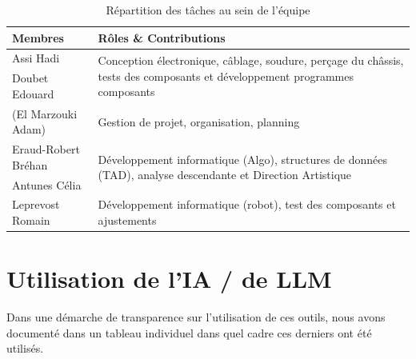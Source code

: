 \begin{table}[H]
    \centering
    \renewcommand{\arraystretch}{1.4} %
    \setlength{\tabcolsep}{12pt}      %
    
    \begin{tabular}{@{} l p{8.5cm} @{}} 
    \toprule
    \textbf{Membres} & \textbf{Rôles \& Contributions} \\ 
    \midrule
    
    Assi Hadi & \multirow{2}{=}{Conception électronique, câblage, soudure, perçage du châssis, tests des composants et développement programmes composants} \\ 
    Doubet Edouard & \\ 
    \addlinespace[0.2cm] %
    
    (El Marzouki Adam) & Gestion de projet, organisation, planning \\ 
    \addlinespace[0.2cm]
    
    Eraud-Robert Bréhan & \multirow{2}{=}{Développement informatique (Algo), structures de données (TAD), analyse descendante et Direction Artistique} \\ 
    Antunes Célia & \\ 
    \addlinespace[0.2cm]
    
    Leprevost Romain & Développement informatique (robot), test des composants et ajustements \\ 
    
    \bottomrule
    \end{tabular}
    \caption{Répartition des tâches au sein de l'équipe}
    \label{tab:repartition}
\end{table}

\section{Utilisation de l'IA / de LLM}
Dans une démarche de transparence sur l'utilisation de ces outils, nous avons documenté dans un tableau individuel dans quel cadre ces derniers ont été utilisés.

\vspace{0.5cm}

